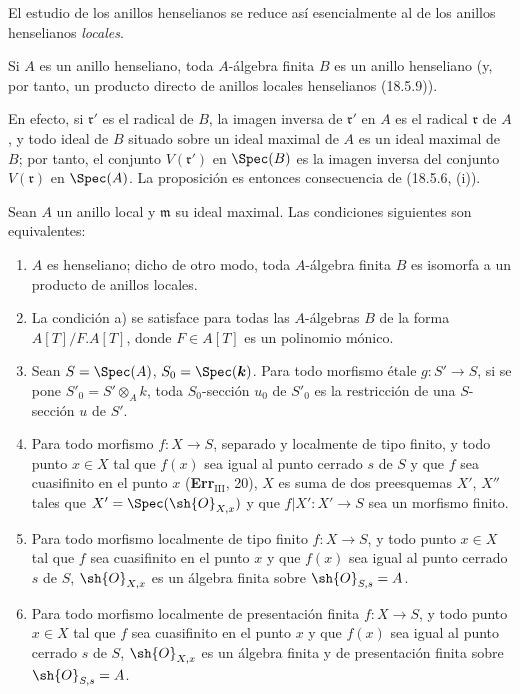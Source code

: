 El estudio de los anillos henselianos se reduce así esencialmente al de los anillos henselianos \emph{locales}.

\begin{proposition}[18.5.10]
\label{IV.18.5.10}
Si $A$ es un anillo henseliano, toda $A$-álgebra finita $B$ es un anillo henseliano \textup{(y, por tanto,} un producto directo de anillos locales henselianos \textup{(18.5.9))}.
\end{proposition}

En efecto, si $\mathfrak r'$ es el radical de $B$, la imagen inversa de $\mathfrak r'$ en $A$ es el radical $\mathfrak r$ de $A$, y todo ideal de $B$ situado sobre un ideal maximal de $A$ es un ideal maximal de $B$; por tanto, el conjunto $V(\mathfrak r')$ en $\Spec(B)$ es la imagen inversa del conjunto $V(\mathfrak r)$ en $\Spec(A)$. La proposición es entonces consecuencia de (18.5.6, (i)).

\begin{theorem}[18.5.11]
\label{IV.18.5.11}
Sean $A$ un anillo local y $\mathfrak m$ su ideal maximal. Las condiciones siguientes son equivalentes:
\begin{enumerate}
  \item[\textup{a)}] $A$ es henseliano; dicho de otro modo, toda $A$-álgebra finita $B$ es isomorfa a un producto de anillos locales.


  \item[\textup{a$'$)}] La condición \textup{a)} se satisface para todas las $A$-álgebras $B$ de la forma $A[T]/F.A[T]$, donde $F\in A[T]$ es un polinomio mónico.
  \item[\textup{b)}] Sean $S=\Spec(A)$, $S_0=\Spec(\boldsymbol{k})$. Para todo morfismo étale $g:S'\to S$, si se pone $S'_0=S'\otimes_A k$, toda $S_0$-sección $u_0$ de $S'_0$ es la restricción de una $S$-sección $u$ de $S'$.
  \item[\textup{c)}] Para todo morfismo $f:X\to S$, separado y localmente de tipo finito, y todo punto $x\in X$ tal que $f(x)$ sea igual al punto cerrado $s$ de $S$ y que $f$ sea cuasifinito en el punto $x$ \textup{(\textbf{Err}$_{\mathrm{III}}$, 20)}, $X$ es suma de dos preesquemas $X'$, $X''$ tales que $X'=\Spec(\sh{O}_{X,x})$ y que $f|X':X'\to S$ sea un morfismo \textup{finito}.
  \item[\textup{c$'$)}] Para todo morfismo localmente de tipo finito $f:X\to S$, y todo punto $x\in X$ tal que $f$ sea cuasifinito en el punto $x$ y que $f(x)$ sea igual al punto cerrado $s$ de $S$, $\sh{O}_{X,x}$ es un álgebra finita sobre $\sh{O}_{S,s}=A$.
  \item[\textup{c$''$)}] Para todo morfismo localmente de presentación finita $f:X\to S$, y todo punto $x\in X$ tal que $f$ sea cuasifinito en el punto $x$ y que $f(x)$ sea igual al punto cerrado $s$ de $S$, $\sh{O}_{X,x}$ es un álgebra finita y de presentación finita sobre $\sh{O}_{S,s}=A$.
\end{enumerate}
\end{theorem}

